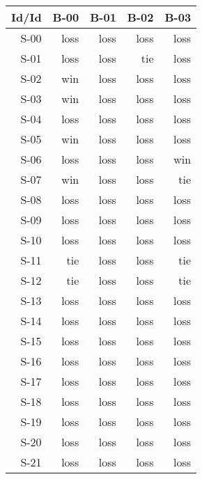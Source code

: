 \begin{tabular}{ | r | r | r | r | r | }
    \hline
        Id/Id  &   B-00  &   B-01  &   B-02  &   B-03  \\
    \hline
    \hline
         S-00  &   loss  &   loss  &   loss  &   loss  \\
    \hline
         S-01  &   loss  &   loss  &    tie  &   loss  \\
    \hline
         S-02  &    win  &   loss  &   loss  &   loss  \\
    \hline
         S-03  &    win  &   loss  &   loss  &   loss  \\
    \hline
         S-04  &   loss  &   loss  &   loss  &   loss  \\
    \hline
         S-05  &    win  &   loss  &   loss  &   loss  \\
    \hline
         S-06  &   loss  &   loss  &   loss  &    win  \\
    \hline
         S-07  &    win  &   loss  &   loss  &    tie  \\
    \hline
         S-08  &   loss  &   loss  &   loss  &   loss  \\
    \hline
         S-09  &   loss  &   loss  &   loss  &   loss  \\
    \hline
         S-10  &   loss  &   loss  &   loss  &   loss  \\
    \hline
         S-11  &    tie  &   loss  &   loss  &    tie  \\
    \hline
         S-12  &    tie  &   loss  &   loss  &    tie  \\
    \hline
         S-13  &   loss  &   loss  &   loss  &   loss  \\
    \hline
         S-14  &   loss  &   loss  &   loss  &   loss  \\
    \hline
         S-15  &   loss  &   loss  &   loss  &   loss  \\
    \hline
         S-16  &   loss  &   loss  &   loss  &   loss  \\
    \hline
         S-17  &   loss  &   loss  &   loss  &   loss  \\
    \hline
         S-18  &   loss  &   loss  &   loss  &   loss  \\
    \hline
         S-19  &   loss  &   loss  &   loss  &   loss  \\
    \hline
         S-20  &   loss  &   loss  &   loss  &   loss  \\
    \hline
         S-21  &   loss  &   loss  &   loss  &   loss  \\

\end{tabular}
